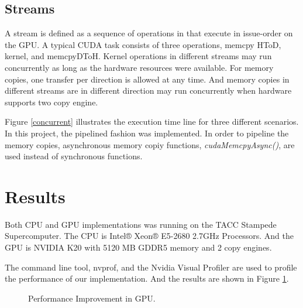 \documentclass[journal,11pt,onecolumn,draftclsnofoot]{ieeeconf}  %
\begin{document}
\subsection{Streams}
A stream is defined as a sequence of operations in that execute in issue-order on the GPU. A typical CUDA task consists of three operations, memcpy HToD, kernel, and memcpyDToH. Kernel operations in different streams may run concurrently as long as the hardware resources were available. For memory copies, one transfer per direction is allowed at any time. And memory copies in different streams are in different direction may run concurrently when hardware supports two copy engine.   \par

Figure \ref{concurrent} illustrates the execution time line for three different scenarios. In this project, the pipelined fashion was implemented. In order to pipeline the memory copies, asynchronous memory copiy functions, \textit{cudaMemcpyAsync()}, are used instead of synchronous functions.\cite{Stream} \par

\section{Results}
Both CPU and GPU implementations was running on the TACC Stampede Supercomputer. The CPU is Intel® Xeon® E5-2680 2.7GHz Processors. And the GPU is NVIDIA K20 with 5120 MB GDDR5 memory and 2 copy engines. \par
The command line tool, nvprof, and the Nvidia Visual Profiler are used to profile the performance of our implementation. And the results are shown in Figure \ref{performances}.

\begin{figure}[h]
	\centering
	\caption{Performance Improvement in GPU.}
	\label{performances}
\end{figure}
\end{document}
